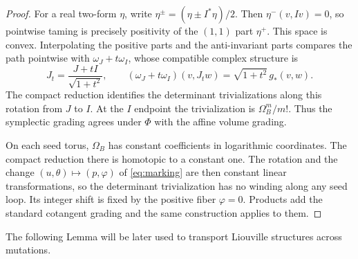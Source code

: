\documentclass[12pt, letter]{amsart}
\theoremstyle{definition}
\numberwithin{equation}{section}
\begin{document}
\begin{proof}
For a real two-form $\eta$, write
$\eta^\pm=(\eta\pm I^*\eta)/2$.
Then $\eta^-(v,Iv)=0$, so pointwise taming is precisely positivity
of the $(1,1)$ part $\eta^+$.
This space is convex. Interpolating the positive parts and the
anti-invariant parts compares the path pointwise with
$\omega_J+t\omega_I$, whose compatible complex structure is
\[
 J_t=\frac{J+tI}{\sqrt{1+t^2}},\qquad
 (\omega_J+t\omega_I)(v,J_tw)=\sqrt{1+t^2}\,g_*(v,w).
\]
The compact reduction identifies the determinant trivializations
along this rotation from $J$ to $I$.
At the $I$ endpoint the trivialization is $\Omega_B^m/m!$.
Thus the symplectic grading agrees under $\Phi$ with the affine
volume grading.

On each seed torus, $\Omega_B$ has constant coefficients in
logarithmic coordinates. The compact reduction there is homotopic
to a constant one. The rotation and the change
$(u,\theta)\mapsto(p,\varphi)$ of \eqref{eq:marking} are then
constant linear transformations, so the determinant trivialization
has no winding along any seed loop.
Its integer shift is fixed by the positive fiber $\varphi=0$.
Products add the standard cotangent grading and the same construction
applies to them.
\end{proof}

The following Lemma will be later used to transport Liouville structures across mutations. 
\end{document}
